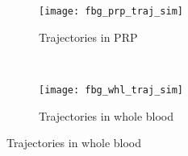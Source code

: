 \documentclass{article}
\begin{document}
\begin{figure}
  \centering
  \begin{subfigure}{\textwidth}
    \texttt{[image: fbg\_prp\_traj\_sim]}
    \caption{Trajectories in PRP}
  \end{subfigure}
  \\
  \begin{subfigure}{\textwidth}
    \texttt{[image: fbg\_whl\_traj\_sim]}
    \caption{Trajectories in whole blood}
  \end{subfigure}
  \label{fig:traj-plots}
\end{figure}

\end{document}
